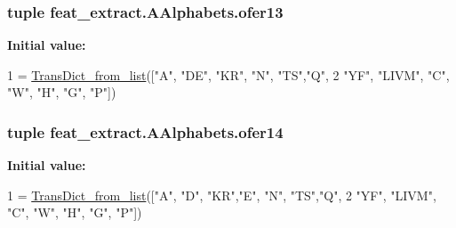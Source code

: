 \subsubsection[{ofer13}]{\setlength{\rightskip}{0pt plus 5cm}tuple feat\+\_\+extract.\+A\+Alphabets.\+ofer13}\label{namespacefeat__extract_1_1_a_alphabets_a43d98012f2d4b0d07d54dfd2d380596f}
{\bfseries Initial value\+:}
\begin{DoxyCode}
1 = \hyperlink{namespacefeat__extract_1_1_a_alphabets_acdda8523b57175e0e79064c4da723c5d}{TransDict\_from\_list}([\textcolor{stringliteral}{"A"}, \textcolor{stringliteral}{"DE"}, \textcolor{stringliteral}{"KR"}, \textcolor{stringliteral}{"N"}, \textcolor{stringliteral}{"TS"},\textcolor{stringliteral}{"Q"},
2  \textcolor{stringliteral}{"YF"}, \textcolor{stringliteral}{"LIVM"}, \textcolor{stringliteral}{"C"}, \textcolor{stringliteral}{"W"}, \textcolor{stringliteral}{"H"}, \textcolor{stringliteral}{"G"}, \textcolor{stringliteral}{"P"}])
\end{DoxyCode}
\hypertarget{namespacefeat__extract_1_1_a_alphabets_a426e6960a21e28fba210585b1a9811f8}{}
\subsubsection[{ofer14}]{\setlength{\rightskip}{0pt plus 5cm}tuple feat\+\_\+extract.\+A\+Alphabets.\+ofer14}\label{namespacefeat__extract_1_1_a_alphabets_a426e6960a21e28fba210585b1a9811f8}
{\bfseries Initial value\+:}
\begin{DoxyCode}
1 = \hyperlink{namespacefeat__extract_1_1_a_alphabets_acdda8523b57175e0e79064c4da723c5d}{TransDict\_from\_list}([\textcolor{stringliteral}{"A"}, \textcolor{stringliteral}{"D"}, \textcolor{stringliteral}{"KR"},\textcolor{stringliteral}{"E"}, \textcolor{stringliteral}{"N"}, \textcolor{stringliteral}{"TS"},\textcolor{stringliteral}{"Q"},
2  \textcolor{stringliteral}{"YF"}, \textcolor{stringliteral}{"LIVM"}, \textcolor{stringliteral}{"C"}, \textcolor{stringliteral}{"W"}, \textcolor{stringliteral}{"H"}, \textcolor{stringliteral}{"G"}, \textcolor{stringliteral}{"P"}])
\end{DoxyCode}
\hypertarget{namespacefeat__extract_1_1_a_alphabets_a0d18db68423614422a99955496a153b3}{}
